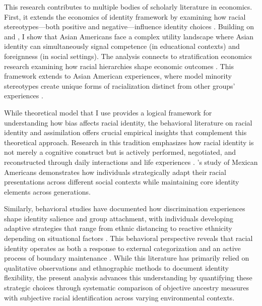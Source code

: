 This research contributes to multiple bodies of scholarly literature in economics. First, it extends the economics of identity framework by examining how racial stereotypes---both positive and negative---influence identity choices \autocite{akerlofEconomicsIdentity2000}. Building on \textcite{charnessSocialIdentityGroup2020} and \textcite{atkinHowWeChoose2021}, I show that Asian Americans face a complex utility landscape where Asian identity can simultaneously signal competence (in educational contexts) and foreignness (in social settings). The analysis connects to stratification economics research examining how racial hierarchies shape economic outcomes \autocite{darityEconomicsIdentityOrigin2006,darityPositionPossessionsStratification2022}. This framework extends to Asian American experiences, where model minority stereotypes create unique forms of racialization distinct from other groups' experiences \autocite{goldsmithDarkLightSkin2007,hamiltonSheddingLightMarriage2009,dietteSkinShadeStratification2015}.

While \textcite{akerlofEconomicsIdentity2000} theoretical model that I use provides a logical framework for understanding how bias affects racial identity, the behavioral literature on racial identity and assimilation offers crucial empirical insights that complement this theoretical approach. Research in this tradition emphasizes how racial identity is not merely a cognitive construct but is actively performed, negotiated, and reconstructed through daily interactions and life experiences \autocite{waters1990ethnic}. \textcite{telles2008generations}'s study of Mexican Americans demonstrates how individuals strategically adapt their racial presentations across different social contexts while maintaining core identity elements across generations. 

Similarly, behavioral studies have documented how discrimination experiences shape identity salience and group attachment, with individuals developing adaptive strategies that range from ethnic distancing to reactive ethnicity depending on situational factors \autocite{zhou1997segmented}. This behavioral perspective reveals that racial identity operates as both a response to external categorization and an active process of boundary maintenance \autocite{cornell2006ethnicity}. While this literature has primarily relied on qualitative observations and ethnographic methods to document identity flexibility, the present analysis advances this understanding by quantifying these strategic choices through systematic comparison of objective ancestry measures with subjective racial identification across varying environmental contexts.

